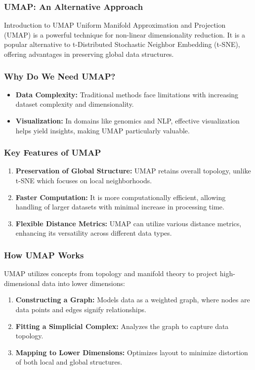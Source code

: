 \documentclass[aspectratio=169]{beamer}
\begin{document}
\begin{frame}[fragile]
    \frametitle{UMAP: An Alternative Approach}
    \begin{block}{Introduction to UMAP}
        Uniform Manifold Approximation and Projection (UMAP) is a powerful technique for non-linear dimensionality reduction. It is a popular alternative to t-Distributed Stochastic Neighbor Embedding (t-SNE), offering advantages in preserving global data structures.
    \end{block}
\end{frame}

\begin{frame}[fragile]
    \frametitle{Why Do We Need UMAP?}
    \begin{itemize}
        \item \textbf{Data Complexity:} Traditional methods face limitations with increasing dataset complexity and dimensionality.
        \item \textbf{Visualization:} In domains like genomics and NLP, effective visualization helps yield insights, making UMAP particularly valuable.
    \end{itemize}
\end{frame}

\begin{frame}[fragile]
    \frametitle{Key Features of UMAP}
    \begin{enumerate}
        \item \textbf{Preservation of Global Structure:} UMAP retains overall topology, unlike t-SNE which focuses on local neighborhoods.
        \item \textbf{Faster Computation:} It is more computationally efficient, allowing handling of larger datasets with minimal increase in processing time.
        \item \textbf{Flexible Distance Metrics:} UMAP can utilize various distance metrics, enhancing its versatility across different data types.
    \end{enumerate}
\end{frame}

\begin{frame}[fragile]
    \frametitle{How UMAP Works}
    UMAP utilizes concepts from topology and manifold theory to project high-dimensional data into lower dimensions:
    \begin{enumerate}
        \item \textbf{Constructing a Graph:} Models data as a weighted graph, where nodes are data points and edges signify relationships.
        \item \textbf{Fitting a Simplicial Complex:} Analyzes the graph to capture data topology.
        \item \textbf{Mapping to Lower Dimensions:} Optimizes layout to minimize distortion of both local and global structures.
    \end{enumerate}
\end{frame}
\end{document}

